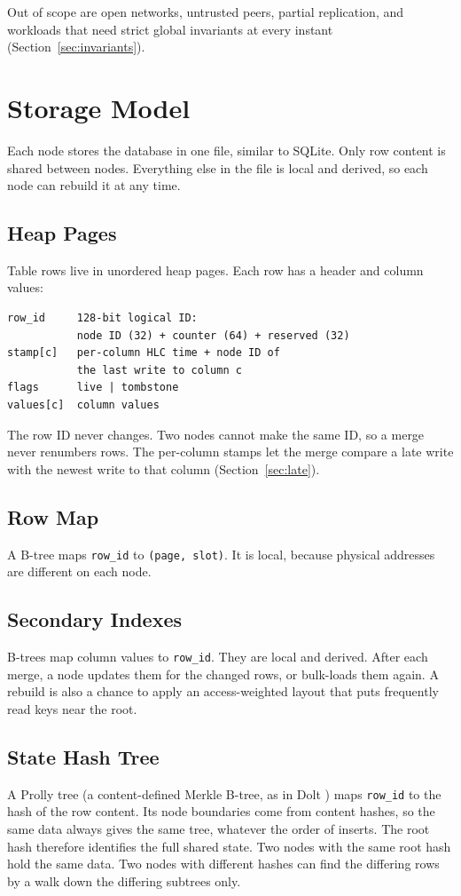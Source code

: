 \documentclass[journal]{IEEEtran}
\newcommand{\code}[1]{\texttt{#1}}
\begin{document}
Out of scope are open networks, untrusted peers, partial replication, and workloads that need strict global invariants at every instant (Section~\ref{sec:invariants}).

\section{Storage Model}\label{sec:storage}
Each node stores the database in one file, similar to SQLite. Only row content is shared between nodes. Everything else in the file is local and derived, so each node can rebuild it at any time.

\subsection{Heap Pages}
Table rows live in unordered heap pages. Each row has a header and column values:
\begin{lstlisting}
row_id     128-bit logical ID:
           node ID (32) + counter (64) + reserved (32)
stamp[c]   per-column HLC time + node ID of
           the last write to column c
flags      live | tombstone
values[c]  column values
\end{lstlisting}
The row ID never changes. Two nodes cannot make the same ID, so a merge never renumbers rows. The per-column stamps let the merge compare a late write with the newest write to that column (Section~\ref{sec:late}).

\subsection{Row Map}
A B-tree maps \code{row\_id} to \code{(page, slot)}. It is local, because physical addresses are different on each node.

\subsection{Secondary Indexes}
B-trees map column values to \code{row\_id}. They are local and derived. After each merge, a node updates them for the changed rows, or bulk-loads them again. A rebuild is also a chance to apply an access-weighted layout that puts frequently read keys near the root.

\subsection{State Hash Tree}
A Prolly tree (a content-defined Merkle B-tree, as in Dolt \cite{dolt}) maps \code{row\_id} to the hash of the row content. Its node boundaries come from content hashes, so the same data always gives the same tree, whatever the order of inserts. The root hash therefore identifies the full shared state. Two nodes with the same root hash hold the same data. Two nodes with different hashes can find the differing rows by a walk down the differing subtrees only.
\end{document}
